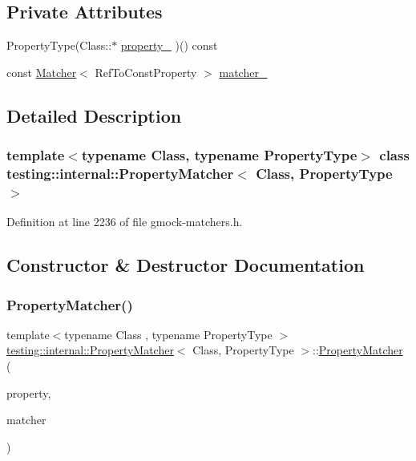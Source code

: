 \subsection*{Private Attributes}
\begin{DoxyCompactItemize}
\item 
Property\+Type(Class\+::$\ast$ \hyperlink{classtesting_1_1internal_1_1PropertyMatcher_a3c7a303b73d6130ba775932a7c26b92d}{property\+\_\+} )() const
\item 
const \hyperlink{classtesting_1_1Matcher}{Matcher}$<$ Ref\+To\+Const\+Property $>$ \hyperlink{classtesting_1_1internal_1_1PropertyMatcher_af7733557fde1558190ab9c63d23f1305}{matcher\+\_\+}
\end{DoxyCompactItemize}


\subsection{Detailed Description}
\subsubsection*{template$<$typename Class, typename Property\+Type$>$\newline
class testing\+::internal\+::\+Property\+Matcher$<$ Class, Property\+Type $>$}



Definition at line 2236 of file gmock-\/matchers.\+h.



\subsection{Constructor \& Destructor Documentation}
\mbox{\label{classtesting_1_1internal_1_1PropertyMatcher_a9b658d58f5c58d02949bb81f7e6b46ce}} 
\subsubsection{\texorpdfstring{Property\+Matcher()}{PropertyMatcher()}}
{\footnotesize\ttfamily template$<$typename Class , typename Property\+Type $>$ \\
\hyperlink{classtesting_1_1internal_1_1PropertyMatcher}{testing\+::internal\+::\+Property\+Matcher}$<$ Class, Property\+Type $>$\+::\hyperlink{classtesting_1_1internal_1_1PropertyMatcher}{Property\+Matcher} (\begin{DoxyParamCaption}\item[{Property\+Type(Class\+::$\ast$)() const}]{property,  }\item[{const \hyperlink{classtesting_1_1Matcher}{Matcher}$<$ Ref\+To\+Const\+Property $>$ \&}]{matcher }\end{DoxyParamCaption})\hspace{0.3cm}{\ttfamily [inline]}}



